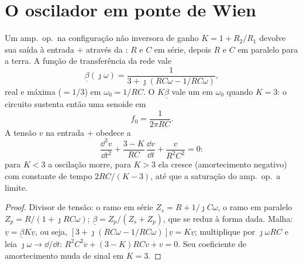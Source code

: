 \section{O oscilador em ponte de Wien}

\begin{proposition}\label{prop:b2:feedback-oscillators:wien}
Um amp.\ op.\ na configuração não inversora de ganho $K = 1 + R_2/R_1$
devolve sua saída à entrada $+$ através da \emph{}:
$R$ e $C$ em série, depois $R$ e $C$ em paralelo para a terra. A função
de transferência da rede vale
\[
\underline\beta(\jmath\omega) = \frac1{3 + \jmath(RC\omega - 1/RC\omega)} ,
\]
real e máxima ($= 1/3$) em $\omega_0 = 1/RC$. O  $K\underline\beta$
vale um em $\omega_0$ quando $K = 3$: o circuito sustenta então uma
senoide em
\[
f_0 = \frac1{2\pi RC} .
\]
A tensão $v$ na entrada $+$ obedece a
\[
\frac{\dd^2v}{\dd t^2} + \frac{3 - K}{RC}\,\frac{\dd v}{\dd t} + \frac{v}{R^2C^2} = 0 :
\]
para $K < 3$ a oscilação morre, para $K > 3$ ela cresce (amortecimento
negativo) com constante de tempo $2RC/(K - 3)$, até que a
saturação do amp.\ op.\ a limite.
\end{proposition}

\begin{proof}
Divisor de tensão: o ramo em série $Z_s = R + 1/\jmath C\omega$, o ramo em
paralelo $Z_p = R/(1 + \jmath RC\omega)$; $\underline\beta = Z_p/(Z_s + Z_p)$, que
se reduz à forma dada. Malha: $\underline v = \underline\beta K\underline v$, ou seja,
$[3 + \jmath(RC\omega - 1/RC\omega)]\underline v = K\underline v$; multiplique por $\jmath\omega RC$
e leia $\jmath\omega \to \dd/\dd t$: $R^2C^2\ddot v + (3 - K)RC\dot v + v = 0$.
Seu coeficiente de amortecimento muda de sinal em $K = 3$.
\end{proof}


